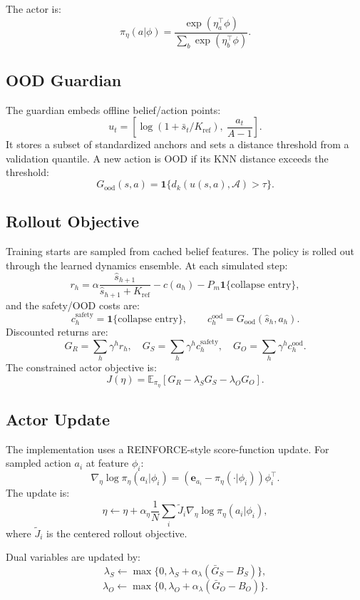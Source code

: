 \documentclass[11pt]{article}
\newcommand{\E}{\mathbb{E}}
\newcommand{\1}{\mathbf{1}}
\begin{document}
The actor is:
\[
  \pi_\eta(a|\phi)=
  \frac{\exp(\eta_a^\top \phi)}
       {\sum_b\exp(\eta_b^\top \phi)}.
\]

\subsection{OOD Guardian}

The guardian embeds offline belief/action points:
\[
  u_t=\left[\log(1+\bar{s}_t/K_{\mathrm{ref}}),\
  \frac{a_t}{A-1}\right].
\]
It stores a subset of standardized anchors and sets a distance threshold from a
validation quantile.  A new action is OOD if its KNN distance exceeds the
threshold:
\[
  G_{\mathrm{ood}}(s,a)=
  \1\{d_k(u(s,a),\mathcal{A})>\tau\}.
\]

\subsection{Rollout Objective}

Training starts are sampled from cached belief features.  The policy is rolled
out through the learned dynamics ensemble.  At each simulated step:
\[
  r_h =
  \alpha\frac{\hat{s}_{h+1}}{\hat{s}_{h+1}+K_{\mathrm{ref}}}
  -c(a_h)
  -P_m\1\{\text{collapse entry}\},
\]
and the safety/OOD costs are:
\[
  c^{\mathrm{safety}}_h=\1\{\text{collapse entry}\},\qquad
  c^{\mathrm{ood}}_h=G_{\mathrm{ood}}(\hat{s}_h,a_h).
\]
Discounted returns are:
\[
  G_R=\sum_h\gamma^h r_h,\quad
  G_S=\sum_h\gamma^h c^{\mathrm{safety}}_h,\quad
  G_O=\sum_h\gamma^h c^{\mathrm{ood}}_h.
\]
The constrained actor objective is:
\[
  J(\eta)=
  \E_{\pi_\eta}\left[
    G_R-\lambda_SG_S-\lambda_OG_O
  \right].
\]

\subsection{Actor Update}

The implementation uses a REINFORCE-style score-function update.  For sampled
action $a_i$ at feature $\phi_i$:
\[
  \nabla_\eta\log\pi_\eta(a_i|\phi_i)
  =
  (\mathbf{e}_{a_i}-\pi_\eta(\cdot|\phi_i))\phi_i^\top.
\]
The update is:
\[
  \eta \leftarrow
  \eta+\alpha_\eta
  \frac{1}{N}\sum_i
  \tilde{J}_i
  \nabla_\eta\log\pi_\eta(a_i|\phi_i),
\]
where $\tilde{J}_i$ is the centered rollout objective.

Dual variables are updated by:
\[
  \lambda_S\leftarrow
  \max\{0,\lambda_S+\alpha_\lambda(\bar{G}_S-B_S)\},
\]
\[
  \lambda_O\leftarrow
  \max\{0,\lambda_O+\alpha_\lambda(\bar{G}_O-B_O)\}.
\]
\end{document}
